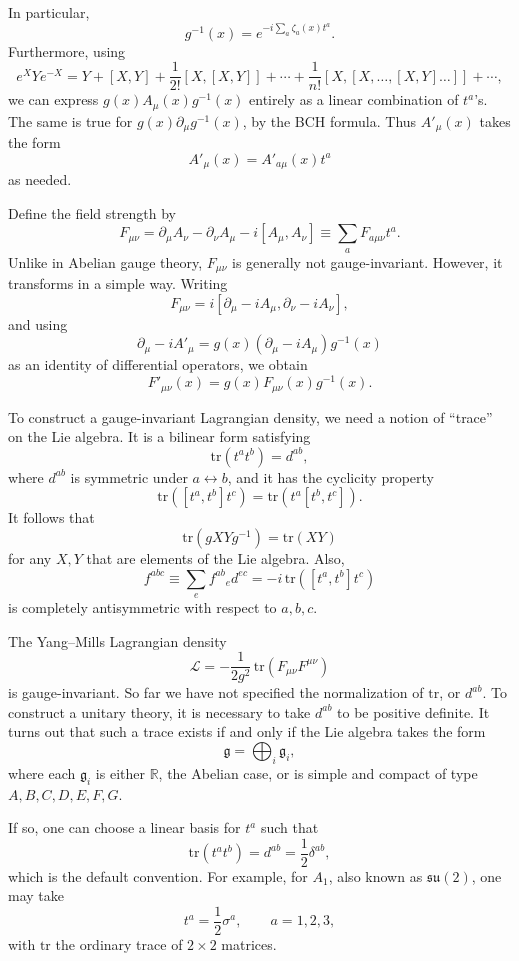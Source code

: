 In particular,
\[
  g^{-1}(x)=e^{-i\sum_a\zeta_a(x)t^a}.
\]
Furthermore, using
\[
  e^X Y e^{-X}
  =
  Y+[X,Y]+\frac1{2!}[X,[X,Y]]
  +\cdots
  +\frac1{n!}[X,[X,\ldots,[X,Y]\ldots]]
  +\cdots ,
\]
we can express \(g(x)A_\mu(x)g^{-1}(x)\) entirely as a linear combination
of \(t^a\)'s.  The same is true for \(g(x)\partial_\mu g^{-1}(x)\), by the
BCH formula.  Thus \(A'_\mu(x)\) takes the form
\[
  A'_\mu(x)=A'_{a\mu}(x)t^a
\]
as needed.

Define the field strength by
\[
  F_{\mu\nu}
  =
  \partial_\mu A_\nu-\partial_\nu A_\mu-i[A_\mu,A_\nu]
  \equiv \sum_a F_{a\mu\nu}t^a.
\]
Unlike in Abelian gauge theory, \(F_{\mu\nu}\) is generally not
gauge-invariant.  However, it transforms in a simple way.  Writing
\[
  F_{\mu\nu}
  =
  i[\partial_\mu-iA_\mu,\partial_\nu-iA_\nu],
\]
and using
\[
  \partial_\mu-iA'_\mu
  =
  g(x)(\partial_\mu-iA_\mu)g^{-1}(x)
\]
as an identity of differential operators, we obtain
\[
  F'_{\mu\nu}(x)=g(x)F_{\mu\nu}(x)g^{-1}(x).
\]

To construct a gauge-invariant Lagrangian density, we need a notion of
``trace'' on the Lie algebra.  It is a bilinear form satisfying
\[
  \mathrm{tr}(t^a t^b)=d^{ab},
\]
where \(d^{ab}\) is symmetric under \(a\leftrightarrow b\), and it has the
cyclicity property
\[
  \mathrm{tr}([t^a,t^b]t^c)
  =
  \mathrm{tr}(t^a[t^b,t^c]).
\]
It follows that
\[
  \mathrm{tr}(gXYg^{-1})=\mathrm{tr}(XY)
\]
for any \(X,Y\) that are elements of the Lie algebra.  Also,
\[
  f^{abc}
  \equiv
  \sum_e f^{ab}{}_{e}d^{ec}
  =
  -i\,\mathrm{tr}([t^a,t^b]t^c)
\]
is completely antisymmetric with respect to \(a,b,c\).

The Yang--Mills Lagrangian density
\[
  \mathcal L
  =
  -\frac{1}{2g^2}\,
  \mathrm{tr}(F_{\mu\nu}F^{\mu\nu})
\]
is gauge-invariant.  So far we have not specified the normalization of
\(\mathrm{tr}\), or \(d^{ab}\).  To construct a unitary theory, it is
necessary to take \(d^{ab}\) to be positive definite.  It turns out that
such a trace exists if and only if the Lie algebra takes the form
\[
  \mathfrak g=\bigoplus_i \mathfrak g_i,
\]
where each \(\mathfrak g_i\) is either \(\mathbb R\), the Abelian case, or
is simple and compact of type \(A,B,C,D,E,F,G\).

If so, one can choose a linear basis for \(t^a\) such that
\[
  \mathrm{tr}(t^a t^b)=d^{ab}=\frac12\delta^{ab},
\]
which is the default convention.  For example, for \(A_1\), also known as
\(\mathfrak{su}(2)\), one may take
\[
  t^a=\frac12\sigma^a,\qquad a=1,2,3,
\]
with \(\mathrm{tr}\) the ordinary trace of \(2\times2\) matrices.

